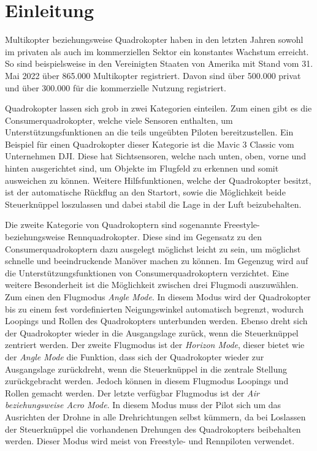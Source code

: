 
\chapter{Einleitung}

Multikopter beziehungsweise Quadrokopter haben in den letzten Jahren sowohl im privaten als auch im kommerziellen Sektor ein konstantes Wachstum erreicht. So sind beispielsweise in den Vereinigten Staaten von Amerika mit Stand vom 31. Mai 2022 über 865.000 Multikopter registriert. Davon sind über 500.000 privat und über 300.000 für die kommerzielle Nutzung registriert. \cites{droneregistrationFAA}{dronestat1}{dronestat2}{dronestat3}

Quadrokopter lassen sich grob in zwei Kategorien einteilen. Zum einen gibt es die Consumerquadrokopter, welche viele  Sensoren enthalten, um Unterstützungsfunktionen an die teils ungeübten Piloten bereitzustellen. Ein Beispiel für einen Quadrokopter dieser Kategorie ist die Mavic 3 Classic vom Unternehmen DJI. Diese hat Sichtsensoren, welche nach unten, oben, vorne und hinten ausgerichtet sind, um Objekte im Flugfeld zu erkennen und somit ausweichen zu können. Weitere Hilfsfunktionen, welche der Quadrokopter besitzt, ist der automatische Rückflug an den Startort, sowie die Möglichkeit beide Steuerknüppel loszulassen und dabei stabil die Lage in der Luft beizubehalten. \cite{djiMavicClassic}

Die zweite Kategorie von Quadrokoptern sind sogenannte Freestyle- beziehungsweise Rennquadrokopter. Diese sind im Gegensatz zu den Consumerquadrokoptern dazu ausgelegt möglichst leicht zu sein, um möglichst schnelle und beeindruckende Manöver machen zu können. Im Gegenzug wird auf die Unterstützungsfunktionen von Consumerquadrokoptern verzichtet. Eine weitere Besonderheit ist die Möglichkeit zwischen drei Flugmodi auszuwählen. Zum einen den Flugmodus \textit{Angle Mode}. In diesem Modus wird der Quadrokopter bis zu einem fest vordefinierten Neigungswinkel automatisch begrenzt, wodurch Loopings und Rollen des Quadrokopters unterbunden werden. Ebenso dreht sich der Quadrokopter wieder in die Ausgangslage zurück, wenn die Steuerknüppel zentriert werden. Der zweite Flugmodus ist der \textit{Horizon Mode}, dieser bietet wie der \textit{Angle Mode} die Funktion, dass sich der Quadrokopter wieder zur Ausgangslage zurückdreht, wenn die Steuerknüppel in die zentrale Stellung zurückgebracht werden. Jedoch können in diesem Flugmodus Loopings und Rollen gemacht werden. Der letzte verfügbar Flugmodus ist der \textit{Air beziehungsweise Acro Mode}. In diesem Modus muss der Pilot sich um das Ausrichten der Drohne in alle Drehrichtungen selbst kümmern, da bei Loslassen der Steuerknüppel die vorhandenen Drehungen des Quadrokopters beibehalten werden. Dieser Modus wird meist von Freestyle- und Rennpiloten verwendet. \cite{wedioFlugmodi}

